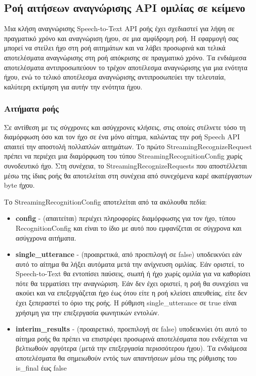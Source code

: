 \documentclass[oneside, 12pt]{book}
\begin{document}
\subsection{Ροή αιτήσεων αναγνώρισης API ομιλίας σε κείμενο}
Μια κλήση αναγνώρισης Speech-to-Text API ροής έχει σχεδιαστεί για λήψη σε πραγματικό χρόνο και αναγνώριση ήχου, σε μια αμφίδρομη ροή. Η εφαρμογή σας μπορεί να στείλει ήχο στη ροή αιτημάτων και να λάβει προσωρινά και τελικά αποτελέσματα αναγνώρισης στη ροή απόκρισης σε πραγματικό χρόνο. Τα ενδιάμεσα αποτελέσματα αντιπροσωπεύουν το τρέχον αποτέλεσμα αναγνώρισης για μια ενότητα ήχου, ενώ το τελικό αποτέλεσμα αναγνώρισης αντιπροσωπεύει την τελευταία, καλύτερη εκτίμηση για αυτήν την ενότητα ήχου.
\subsubsection{Αιτήματα ροής}
Σε αντίθεση με τις σύγχρονες και ασύγχρονες κλήσεις, στις οποίες στέλνετε τόσο τη διαμόρφωση όσο και τον ήχο σε ένα μόνο αίτημα, καλώντας την ροή Speech API απαιτεί την αποστολή πολλαπλών αιτημάτων. Το πρώτο StreamingRecognizeRequest πρέπει να περιέχει μια διαμόρφωση του τύπου StreamingRecognitionConfig χωρίς συνοδευτικό ήχο. Στη συνέχεια, το StreamingRecognizeRequests που αποστέλλεται μέσω της ίδιας ροής θα αποτελείται στη συνέχεια από συνεχόμενα καρέ ακατέργαστων byte ήχου.

Το StreamingRecognitionConfig αποτελείται από τα ακόλουθα πεδία:
\begin{itemize}
  \item \textbf{config} - (απαιτείται) περιέχει πληροφορίες διαμόρφωσης για τον ήχο, τύπου RecognitionConfig και είναι το ίδιο με αυτό που εμφανίζεται σε σύγχρονα και ασύγχρονα αιτήματα.
  \item \textbf{single\_utterance} - (προαιρετικά, από προεπιλογή σε false) υποδεικνύει εάν αυτό το αίτημα θα λήξει αυτόματα μετά την ανίχνευση ομιλίας. Εάν οριστεί, το Speech-to-Text θα εντοπίσει παύσεις, σιωπή ή ήχο χωρίς ομιλία για να καθορίσει πότε θα τερματίσει την αναγνώριση. Εάν δεν έχει οριστεί, η ροή θα συνεχίσει να ακούει και να επεξεργάζεται ήχο έως ότου είτε η ροή κλείσει απευθείας, είτε δεν έχει ξεπεραστεί το όριο της ροής. Η ρύθμιση single\_utterance σε true είναι χρήσιμη για την επεξεργασία φωνητικών εντολών.
  \item \textbf{interim\_results} - (προαιρετικό, προεπιλογή σε false) υποδεικνύει ότι αυτό το αίτημα ροής θα πρέπει να επιστρέφει προσωρινά αποτελέσματα που ενδέχεται να βελτιωθούν αργότερα (μετά την επεξεργασία περισσότερου ήχου). Τα ενδιάμεσα αποτελέσματα θα σημειωθούν εντός των απαντήσεων μέσω της ρύθμισης του is\_final έως false
\end{itemize}
\end{document}
